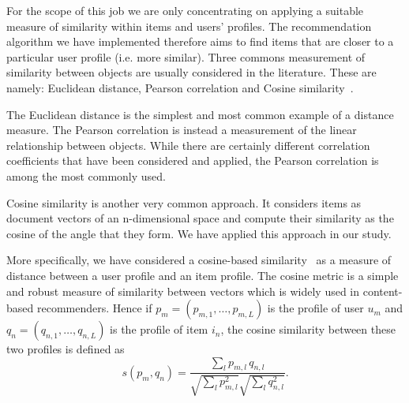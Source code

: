 For the scope of this job we are only concentrating on applying a suitable measure of similarity within items and users' profiles. The recommendation algorithm we have implemented therefore aims to find items that are closer to a particular user profile (i.e. more similar). Three commons measurement of similarity between objects are usually considered in the literature. These are namely: Euclidean distance, Pearson correlation and Cosine similarity~\cite{recc-sys-handbook}. 

The Euclidean distance is the simplest and most common example of a distance measure. The Pearson correlation is instead a measurement of the linear relationship between objects. While there are certainly different correlation coefficients that have been considered and applied, the Pearson correlation is among the most commonly used. 

Cosine similarity is another very common approach. It considers items as document vectors of an n-dimensional space and compute their similarity as the cosine of the angle that they form. We have applied this approach in our study.

More specifically, we have considered a cosine-based similarity~\cite{Markines09WWW} as a measure of distance between a user profile and an item profile.
The cosine metric is a simple and robust measure of similarity between vectors which is widely used in content-based recommenders.
Hence if $p_m = (p_{m,1},\ldots,p_{m,L})$ is the profile of user $u_m$ and $ q_n=(q_{n,1},\ldots,q_{n,L}) $  is the profile of item $i_n$, the cosine similarity between these two profiles is defined as
$$ s(p_m,q_n)= \frac { \sum_{l} {p_{m,l}}\, q_{n,l} } { \sqrt{\sum_l {p_{m,l}^2} } \sqrt{ \sum_l {q_{n,l}^2 } } }.$$

